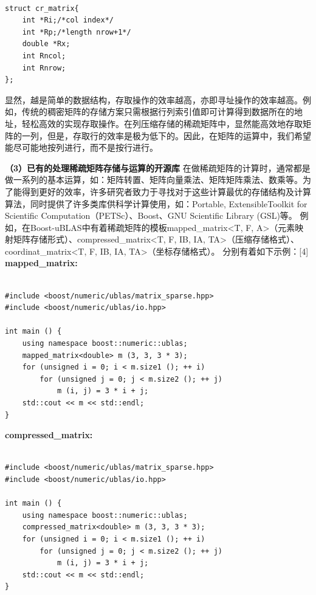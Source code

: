 \documentclass{article}
\begin{document}
\begin{lstlisting}

struct cr_matrix{ 
	int *Ri;/*col index*/ 
	int *Rp;/*length nrow+1*/ 
	double *Rx; 
	int Rncol;
	int Rnrow;
};

\end{lstlisting}

显然，越是简单的数据结构，存取操作的效率越高，亦即寻址操作的效率越高。例如，传统的稠密矩阵的存储方案只需根据行列索引值即可计算得到数据所在的地址，轻松高效的实现存取操作。在列压缩存储的稀疏矩阵中，显然能高效地存取矩阵的一列，但是，存取行的效率是极为低下的。因此，在矩阵的运算中，我们希望能尽可能地按列进行，而不是按行进行。


\textbf{（3）已有的处理稀疏矩阵存储与运算的开源库}
      \qquad
\newline
在做稀疏矩阵的计算时，通常都是做一系列的基本运算，如：矩阵转置、矩阵向量乘法、矩阵矩阵乘法、数乘等。为了能得到更好的效率，许多研究者致力于寻找对于这些计算最优的存储结构及计算算法，同时提供了许多类库供科学计算使用，如：Portable, ExtensibleToolkit for Scientific Computation（PETSc）、Boost、GNU Scientific Library (GSL)等。\newline
例如，在Boost-uBLAS中有着稀疏矩阵的模板mapped\_matrix<T, F, A>（元素映射矩阵存储形式）、compressed\_matrix<T, F, IB, IA, TA>（压缩存储格式）、coordinat\_matrix<T, F, IB, IA, TA>（坐标存储格式）。
分别有着如下示例：[4]\newline
\textbf{mapped\_matrix:}
\begin{lstlisting}

#include <boost/numeric/ublas/matrix_sparse.hpp>
#include <boost/numeric/ublas/io.hpp>

int main () {
    using namespace boost::numeric::ublas;
    mapped_matrix<double> m (3, 3, 3 * 3);
    for (unsigned i = 0; i < m.size1 (); ++ i)
        for (unsigned j = 0; j < m.size2 (); ++ j)
            m (i, j) = 3 * i + j;
    std::cout << m << std::endl;
}

\end{lstlisting}

\textbf{compressed\_matrix:}
\begin{lstlisting}

#include <boost/numeric/ublas/matrix_sparse.hpp>
#include <boost/numeric/ublas/io.hpp>

int main () {
    using namespace boost::numeric::ublas;
    compressed_matrix<double> m (3, 3, 3 * 3);
    for (unsigned i = 0; i < m.size1 (); ++ i)
        for (unsigned j = 0; j < m.size2 (); ++ j)
            m (i, j) = 3 * i + j;
    std::cout << m << std::endl;
}

\end{lstlisting}
\end{document}
